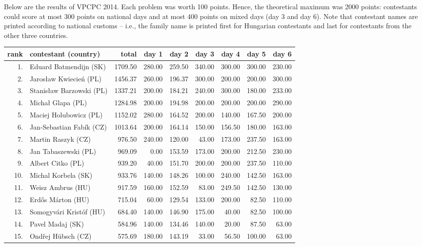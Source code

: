 
Below are the results of VPCPC 2014. Each problem was worth 100 points. 
Hence, the theoretical maximum was 2000 points: contestants could 
score at most 300 points on national days and at most 400 points
on mixed days (day 3 and day 6). Note that contestant names are
printed according to national customs -- i.e., the family name is
printed first for Hungarian contestants and last for contestants from
the other three countries.
\bigskip
\bigskip

\begin{tabular}{rl|r|rrrrrr}
rank & contestant (country) & total & day 1 & day 2 & day 3 & day 4 & day 5 & day 6 \\
\hline
 1. & Eduard Batmendijn (SK) & 1709.50 & 280.00 & 259.50 & 340.00 & 300.00 & 300.00 & 230.00 \\
 2. & Jarosław Kwiecień (PL) & 1456.37 & 260.00 & 196.37 & 300.00 & 200.00 & 200.00 & 300.00 \\
 3. & Stanisław Barzowski (PL) & 1337.21 & 200.00 & 184.21 & 240.00 & 300.00 & 180.00 & 233.00 \\
 4. & Michał Glapa (PL) & 1284.98 & 200.00 & 194.98 & 200.00 & 200.00 & 200.00 & 290.00 \\
 5. & Maciej Holubowicz (PL) & 1152.02 & 280.00 & 164.52 & 200.00 & 140.00 & 167.50 & 200.00 \\
 6. & Jan-Sebastian Fabík (CZ) & 1013.64 & 200.00 & 164.14 & 150.00 & 156.50 & 180.00 & 163.00 \\
 7. & Martin Raszyk (CZ) & 976.50 & 240.00 & 120.00 & 43.00 & 173.00 & 237.50 & 163.00 \\
 8. & Jan Tabaszewski (PL) & 969.09 & 0.00 & 153.59 & 173.00 & 200.00 & 212.50 & 230.00 \\
 9. & Albert Citko (PL) & 939.20 & 40.00 & 151.70 & 200.00 & 200.00 & 237.50 & 110.00 \\
10. & Michal Korbela (SK) & 933.76 & 140.00 & 148.26 & 100.00 & 240.00 & 142.50 & 163.00 \\
11. & Weisz Ambrus (HU) & 917.59 & 160.00 & 152.59 & 83.00 & 249.50 & 142.50 & 130.00 \\
12. & Erdős Márton (HU) & 715.04 & 60.00 & 129.54 & 133.00 & 200.00 & 82.50 & 110.00 \\
13. & Somogyvári Kristóf (HU) & 684.40 & 140.00 & 146.90 & 175.00 & 40.00 & 82.50 & 100.00 \\
14. & Pavel Madaj (SK) & 584.96 & 140.00 & 134.46 & 140.00 & 20.00 & 87.50 & 63.00 \\
15. & Ondřej Hübsch (CZ) & 575.69 & 180.00 & 143.19 & 33.00 & 56.50 & 100.00 & 63.00 \\

\end{tabular}
